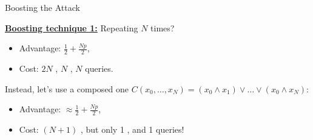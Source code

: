\documentclass[handout]{beamer}
\begin{document}
	\begin{frame}{Boosting the \indcpad Attack}
 
    {\small
    \underline{\bf Boosting technique 1:} Repeating $N$ times?
    \begin{itemize}
        \item Advantage: $\frac{1}{2} + \frac{Np}{2}$,
        \item Cost: $2N$ \enc, $N$ \eval, $N$ \dec queries.
    \end{itemize}\pause\vspace{0.3cm}
    
    Instead, let's use a composed one $C(x_0, \dots, x_{N}) = (x_0 \wedge x_1) \vee \dots \vee (x_0 \wedge x_N)$:
    \begin{itemize}
        \item Advantage: $\approx \frac{1}{2} + \frac{Np}{2}$,
        \item Cost: $(N+1)$ \enc, but only 1 \eval, and 1 \dec queries!
    \end{itemize}
    }
	\end{frame}
\end{document}
